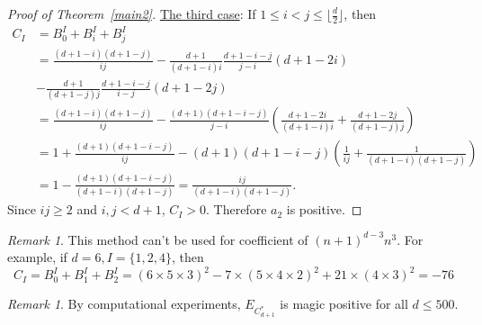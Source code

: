 \documentclass[a4paper,reqno,11pt, oneside]{amsart}
\theoremstyle{definition}
\theoremstyle{remark}
\newtheorem{rem}[thm]{Remark}
\begin{document}
\begin{proof}[Proof of Theorem~\ref{main2}]
\noindent
\underline{The third case}: If $1 \leq i < j \leq \lfloor \frac{d}{2} \rfloor$, then
\begin{align*}
C_I &= B_0^I + B_i^I + B_j^I \\
&= \frac{(d+1-i)(d+1-j)}{ij} - \frac{d+1}{(d+1-i)i}\frac{d+1-i-j}{j-i}(d+1-2i) \\
&- \frac{d+1}{(d+1-j)j}\frac{d+1-i-j}{i-j}(d+1-2j) \\
&= \frac{(d+1-i)(d+1-j)}{ij} - \frac{(d+1)(d+1-i-j)}{j-i}\left(\frac{d+1-2i}{(d+1-i)i} + \frac{d+1-2j}{(d+1-j)j}\right) \\
&= 1 + \frac{(d+1)(d+1-i-j)}{ij} - (d+1)(d+1-i-j)\left(\frac{1}{ij} + \frac{1}{(d+1-i)(d+1-j)}\right) \\
&= 1 - \frac{(d+1)(d+1-i-j)}{(d+1-i)(d+1-j)} = \frac{ij}{(d+1-i)(d+1-j)}.
\end{align*}
Since $ij \geq 2$ and $i, j < d + 1$, $C_I > 0$. Therefore $a_2$ is positive.
\end{proof}

\begin{rem}
This method can't be used for coefficient of $(n+1)^{d-3}n^3$. For example, if $d=6, I = \{1, 2, 4\}$, then
$$C_I = B_0^I + B_1^I+ B_2^I = (6\times5\times3)^2 - 7\times(5\times4\times2)^2 + 21\times(4\times3)^2 = -76$$
\end{rem}

\begin{rem}
By computational experiments, $E_{C_{d+1}^\ast}$ is magic positive for all $d \leq 500$. 
\end{rem}


\medskip

 

\end{document}
